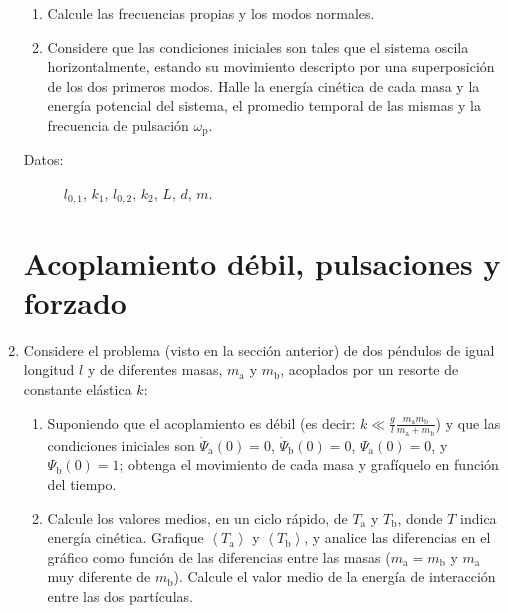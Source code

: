 \documentclass[11pt,spanish]{article}
\begin{document}
\begin{enumerate}
    \begin{enumerate}
        \item Calcule las frecuencias propias y los modos normales.

        \item Considere que las condiciones iniciales son tales que el sistema
        oscila horizontalmente, estando su movimiento descripto por una
        superposición de los dos primeros modos. Halle la energía cinética de
        cada masa y la energía potencial del sistema, el promedio temporal de
        las mismas y la frecuencia de pulsación $\omega_\text{p}$.
    \end{enumerate}

    \begin{description}
        \item [{Datos:}] $l_{0,1}$, $k_{1}$, $l_{0,2}$, $k_{2}$, $L$, $d$,
    $m$.
    \end{description}


    \section*{Acoplamiento débil, pulsaciones y forzado}


    \item Considere el problema (visto en la sección anterior) de dos péndulos
    de igual longitud $l$ y de diferentes masas, $m_\text{a}$ y $m_\text{b}$,
    acoplados por un resorte de constante elástica $k$:

    \begin{enumerate}
        
        \item Suponiendo que el acoplamiento es débil (es decir:
        $k \ll \frac{g}{l} \frac{m_\text{a}m_\text{b}}{m_\text{a}+m_\text{b}}$)
        y que las condiciones
        iniciales son $\dot{\Psi}_\text{a}(0)=0$, $\dot{\Psi}_\text{b}(0)=0$, 
        $\Psi_\text{a}(0)=0$, y $\Psi_\text{b}(0)=1$; obtenga el movimiento de
        cada masa y grafíquelo en función del tiempo.

        \item Calcule los valores medios, en un ciclo rápido, de $T_\text{a}$ y
        $T_\text{b}$, donde $T$ indica energía cinética. Grafique
        $\left\langle T_\text{a}\right\rangle$ y
        $\left\langle T_\text{b}\right\rangle$, y analice las diferencias en
        el gráfico como función de las diferencias entre las masas
        ($m_\text{a}=m_\text{b}$ y $m_\text{a}$ muy diferente de $m_\text{b}$).
        Calcule el valor medio de la energía de interacción entre las dos
        partículas.    
    \end{enumerate}    


\end{enumerate}
\end{document}
